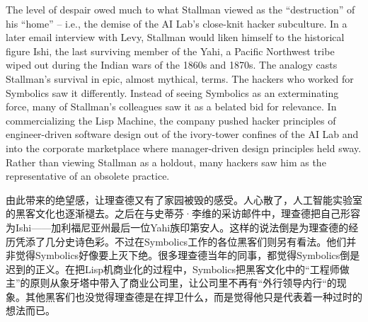 \ifdefined\eng
The level of despair owed much to what Stallman viewed as the ``destruction'' of his ``home'' -- i.e., the demise of the AI Lab's close-knit hacker subculture. In a later email interview with Levy, Stallman would liken himself to the historical figure Ishi, the last surviving member of the Yahi, a Pacific Northwest tribe wiped out during the Indian wars of the 1860s and 1870s. The analogy casts Stallman's survival in epic, almost mythical, terms. The hackers
who worked for Symbolics saw it differently. Instead of seeing Symbolics as an exterminating force, many of Stallman's colleagues saw it as a belated bid for relevance. In commercializing the Lisp Machine, the company pushed hacker principles of engineer-driven software design out of the ivory-tower confines of the AI Lab and into the corporate marketplace where manager-driven design principles held sway. Rather than viewing Stallman as a holdout, many hackers saw him as the representative of an obsolete practice.
\fi

\ifdefined\chs
由此带来的绝望感，让理查德又有了家园被毁的感受。人心散了，人工智能实验室的黑客文化也逐渐褪去。之后在与史蒂芬·李维的采访邮件中，理查德把自己形容为Ishi——加利福尼亚州最后一位Yahi族印第安人。这样的说法倒是为理查德的经历凭添了几分史诗色彩。不过在Symbolics工作的各位黑客们则另有看法。他们并非觉得Symbolics好像要上灭下绝。很多理查德当年的同事，都觉得Symbolics倒是迟到的正义。在把Lisp机商业化的过程中，Symbolics把黑客文化中的“工程师做主”的原则从象牙塔中带入了商业公司里，让公司里不再有“外行领导内行“的现象。其他黑客们也没觉得理查德是在捍卫什么，而是觉得他只是代表着一种过时的想法而已。
\fi

